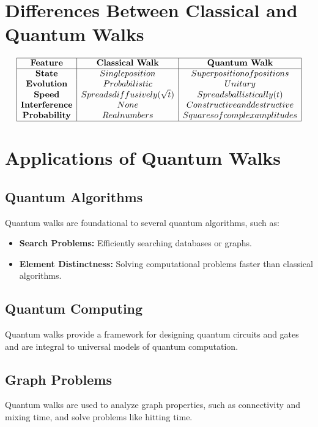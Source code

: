 \documentclass[11pt]{article}
\theoremstyle{definition}
\begin{document}
\section*{Differences Between Classical and Quantum Walks}
\[
\begin{array}{|c|c|c|}
\hline
\textbf{Feature} & \textbf{Classical Walk} & \textbf{Quantum Walk} \\
\hline
\textbf{State} & Single position & Superposition of positions \\
\textbf{Evolution} & Probabilistic & Unitary \\
\textbf{Speed} & Spreads diffusively (\sqrt{t}) & Spreads ballistically (t) \\
\textbf{Interference} & None & Constructive and destructive \\
\textbf{Probability} & Real numbers & Squares of complex amplitudes \\
\hline
\end{array}
\]

\section*{Applications of Quantum Walks}

\subsection*{Quantum Algorithms}
Quantum walks are foundational to several quantum algorithms, such as:
\begin{itemize}
    \item \textbf{Search Problems:} Efficiently searching databases or graphs.
    \item \textbf{Element Distinctness:} Solving computational problems faster than classical algorithms.
\end{itemize}

\subsection*{Quantum Computing}
Quantum walks provide a framework for designing quantum circuits and gates and are integral to universal models of quantum computation.

\subsection*{Graph Problems}
Quantum walks are used to analyze graph properties, such as connectivity and mixing time, and solve problems like hitting time.
\end{document}

